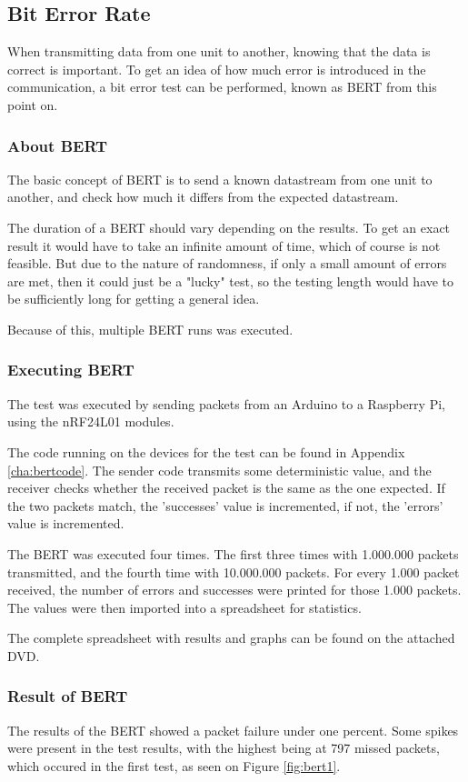 \subsection{Bit Error Rate}
When transmitting data from one unit to another, knowing that the data is correct is important. To get an idea of how much error is introduced in the communication, a bit error test can be performed, known as BERT from this point on.

\subsubsection*{About BERT}

The basic concept of BERT is to send a known datastream from one unit to another, and check how much it differs from the expected datastream.

The duration of a BERT should vary depending on the results. To get an exact result it would have to take an infinite amount of time, which of course is not feasible. But due to the nature of randomness, if only a small amount of errors are met, then it could just be a "lucky" test, so the testing length would have to be sufficiently long for getting a general idea.

Because of this, multiple BERT runs was executed.

\subsubsection*{Executing BERT} 
The test was executed by sending packets from an Arduino to a Raspberry Pi, using the nRF24L01 modules.

The code running on the devices for the test can be found in Appendix \ref{cha:bertcode}.
The sender code transmits some deterministic value, and the receiver checks whether the received packet is the same as the one expected. If the two packets match, the 'successes' value is incremented, if not, the 'errors' value is incremented.

The BERT was executed four times. The first three times with 1.000.000 packets transmitted, and the fourth time with 10.000.000 packets. For every 1.000 packet received, the number of errors and successes were printed for those 1.000 packets. 
The values were then imported into a spreadsheet for statistics.

The complete spreadsheet with results and graphs can be found on the attached DVD. 

\subsubsection*{Result of BERT}
The results of the BERT showed a packet failure under one percent. Some spikes were present in the test results, with the highest being at 797 missed packets, which occured in the first test, as seen on Figure \ref{fig:bert1}.


